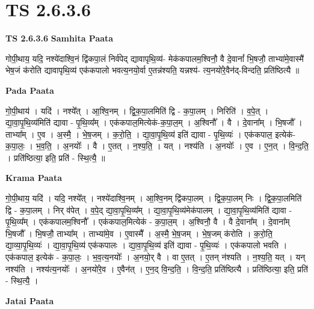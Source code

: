\documentclass[17pt]{extarticle}
\begin{document}
\section*{ TS 2.6.3.6 }

\textbf{TS 2.6.3.6 } \newline
\textbf{Samhita Paata} \newline

गोपी॒थाय॒ यदि॒ नश्ये॑दाश्वि॒नं द्वि॑कपा॒लं निर्व॑पेद् द्यावापृथि॒व्य॑- मेक॑कपालम॒श्विनौ॒ वै दे॒वानां᳚ भि॒षजौ॒ ताभ्या॑मे॒वास्मै॑ भेष॒जं क॑रोति द्यावापृथि॒व्य॑ एक॑कपालो भवत्य॒नयो॒र्वा ए॒तन्न॑श्यति॒ यन्नश्य॑- त्य॒नयो॑रे॒वैन॑द्-विन्दति॒ प्रति॑ष्ठित्यै ॥ \newline

\textbf{Pada Paata} \newline

गो॒पी॒थाय॑ । यदि॑ । नश्ये᳚त् । आ॒श्वि॒नम् । द्वि॒क॒पा॒लमिति॑ द्वि - क॒पा॒लम् । निरिति॑ । व॒पे॒त् । द्या॒वा॒पृ॒थि॒व्य॑मिति॑ द्यावा - पृ॒थि॒व्य᳚म् । एक॑कपाल॒मित्येक॑-क॒पा॒ल॒म् । अ॒श्विनौ᳚ । वै । दे॒वाना᳚म् । भि॒षजौ᳚ । ताभ्या᳚म् । ए॒व । अ॒स्मै॒ । भे॒ष॒जम् । क॒रो॒ति॒ । द्या॒वा॒पृ॒थि॒व्य॑ इति॑ द्यावा - पृ॒थि॒व्यः॑ । एक॑कपाल॒ इत्येक॑-क॒पा॒लः॒ । भ॒व॒ति॒ । अ॒नयोः᳚ । वै । ए॒तत् । न॒श्य॒ति॒ । यत् । नश्य॑ति । अ॒नयोः᳚ । ए॒व । ए॒न॒त् । वि॒न्द॒ति॒ । प्रति॑ष्ठित्या॒ इति॒ प्रति॑ - स्थि॒त्यै॒ ॥  \newline


\textbf{Krama Paata} \newline

गो॒पी॒थाय॒ यदि॑ । यदि॒ नश्ये᳚त् । नश्ये॑दाश्वि॒नम् । आ॒श्वि॒नम् द्वि॑कपा॒लम् । द्वि॒क॒पा॒लम् निः । द्वि॒क॒पा॒लमिति॑ द्वि - क॒पा॒लम् । निर् व॑पेत् । व॒पे॒द् द्या॒वा॒पृ॒थि॒व्य᳚म् । द्या॒वा॒पृ॒थि॒व्य॑मेक॑पालम् । द्या॒वा॒पृ॒थि॒व्य॑मिति॑ द्यावा - पृ॒थि॒व्य᳚म् । एक॑कपालम॒श्विनौ᳚ । एक॑कपाल॒मित्येक॑ - क॒पा॒ल॒म् । अ॒श्विनौ॒ वै । वै दे॒वाना᳚म् । दे॒वाना᳚म् भि॒षजौ᳚ । भि॒षजौ॒ ताभ्या᳚म् । ताभ्या॑मे॒व । ए॒वास्मै᳚ । अ॒स्मै॒ भे॒ष॒जम् । भे॒ष॒जम् क॑रोति । क॒रो॒ति॒ द्या॒व्या॒पृ॒थि॒व्यः॑ । द्या॒वा॒पृ॒थि॒व्य॑ एक॑कपालः । द्या॒वा॒पृ॒थि॒व्य॑ इति॑ द्यावा - पृ॒थि॒व्यः॑ । एक॑कपालो भवति । एक॑कपाल॒ इत्येक॑ - क॒पा॒लः॒ । भ॒व॒त्य॒नयोः᳚ । अ॒नयो॒र् वै । वा ए॒तत् । ए॒तन् न॑श्यति । न॒श्य॒ति॒ यत् । यन् नश्य॑ति । नश्य॑त्य॒नयोः᳚ । अ॒नयो॑रे॒व । ए॒वैन॑त् । ए॒न॒द् वि॒न्द॒ति॒ । वि॒न्द॒ति॒ प्रति॑ष्ठित्यै । प्रति॑ष्ठित्या॒ इति॒ प्रति॑ - स्थि॒त्यै॒ । \newline

\textbf{Jatai Paata} \newline
\end{document}
